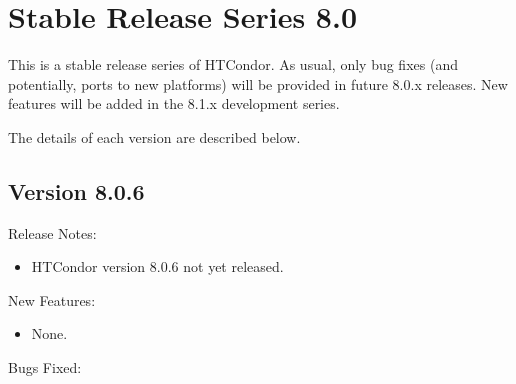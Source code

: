 
\section{\label{sec:History-8-0}Stable Release Series 8.0}

This is a stable release series of HTCondor.
As usual, only bug fixes (and potentially, ports to new platforms)
will be provided in future 8.0.x releases.
New features will be added in the 8.1.x development series.

The details of each version are described below.

\subsection*{\label{sec:New-8-0-6}Version 8.0.6}

\noindent Release Notes:

\begin{itemize}

\item HTCondor version 8.0.6 not yet released.

\end{itemize}


\noindent New Features:

\begin{itemize}

\item None.

\end{itemize}

\noindent Bugs Fixed:


